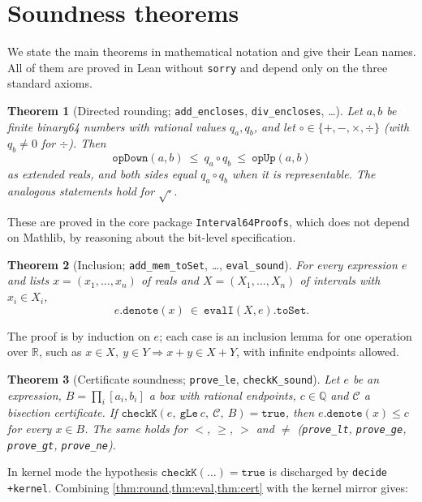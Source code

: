 \documentclass[11pt]{article}
\newtheorem{theorem}{Theorem}
\theoremstyle{definition}
\theoremstyle{remark}
\newcommand{\R}{\mathbb{R}}
\newcommand{\Q}{\mathbb{Q}}
\newcommand{\lean}[1]{\texttt{#1}}
\begin{document}
\section{Soundness theorems}\label{sec:theorems}

We state the main theorems in mathematical notation and give their Lean
names. All of them are proved in Lean without \lean{sorry} and depend only
on the three standard axioms.

\begin{theorem}[Directed rounding; \lean{add\_encloses}, \lean{div\_encloses}, \dots]
\label{thm:round}
Let $a,b$ be finite binary64 numbers with rational values $q_a,q_b$, and
let $\circ\in\{+,-,\times,\div\}$ (with $q_b\ne0$ for $\div$). Then
\[
  \lean{opDown}(a,b)\ \le\ q_a\circ q_b\ \le\ \lean{opUp}(a,b)
\]
as extended reals, and both sides equal $q_a\circ q_b$ when it is
representable. The analogous statements hold for $\sqrt{\cdot}$.
\end{theorem}
These are proved in the core package \lean{Interval64Proofs}, which does not
depend on Mathlib, by reasoning about the bit-level specification.

\begin{theorem}[Inclusion; \lean{add\_mem\_toSet}, \dots, \lean{eval\_sound}]
\label{thm:eval}
For every expression $e$ and lists $x=(x_1,\dots,x_n)$ of reals and
$X=(X_1,\dots,X_n)$ of intervals with $x_i\in X_i$,
\[
  e.\lean{denote}(x)\ \in\ \lean{evalI}(X,e).\lean{toSet}.
\]
\end{theorem}
The proof is by induction on $e$; each case is an inclusion lemma for one
operation over $\R$, such as $x\in X,\ y\in Y\Rightarrow x+y\in X+Y$, with
infinite endpoints allowed.

\begin{theorem}[Certificate soundness; \lean{prove\_le}, \lean{checkK\_sound}]
\label{thm:cert}
Let $e$ be an expression, $B=\prod_i[a_i,b_i]$ a box with rational
endpoints, $c\in\Q$ and $\mathcal C$ a bisection certificate. If
$\lean{checkK}(e,\ \lean{gLe}\ c,\ \mathcal C,\ B)=\lean{true}$, then
$e.\lean{denote}(x)\le c$ for every $x\in B$. The same holds for $<$, $\ge$,
$>$ and $\ne$ (\lean{prove\_lt}, \lean{prove\_ge}, \lean{prove\_gt},
\lean{prove\_ne}).
\end{theorem}

In kernel mode the hypothesis $\lean{checkK}(\dots)=\lean{true}$ is
discharged by \lean{decide +kernel}. Combining
\cref{thm:round,thm:eval,thm:cert} with the kernel mirror gives:
\end{document}
